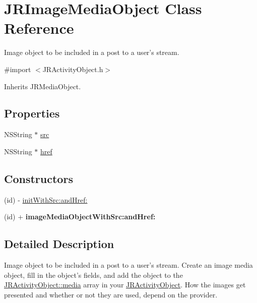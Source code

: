 \hypertarget{interface_j_r_image_media_object}{
\section{JRImageMediaObject Class Reference}
\label{interface_j_r_image_media_object}
}


Image object to be included in a post to a user's stream.  




{\ttfamily \#import $<$JRActivityObject.h$>$}



Inherits JRMediaObject.

\subsection*{Properties}
\begin{DoxyCompactItemize}
\item 
NSString $\ast$ \hyperlink{interface_j_r_image_media_object_aad75823f9189dfca758bc4d4712c3621}{src}
\item 
NSString $\ast$ \hyperlink{interface_j_r_image_media_object_a95642c3f4bc97a112a3ab32beef46f66}{href}
\end{DoxyCompactItemize}
\subsection*{Constructors}
\label{_amgrp559a25fdb98a7d1fd1c3771ac568d5e9}
 \begin{DoxyCompactItemize}
\item 
(id) -\/ \hyperlink{interface_j_r_image_media_object_a8a15f579b784dbdcdaeea9dc1da56cb3}{initWithSrc:andHref:}
\item 
\hypertarget{interface_j_r_image_media_object_af1e6318b91ab6cda8eba464767b2c81d}{
(id) + {\bfseries imageMediaObjectWithSrc:andHref:}}
\label{interface_j_r_image_media_object_af1e6318b91ab6cda8eba464767b2c81d}

\end{DoxyCompactItemize}


\subsection{Detailed Description}
Image object to be included in a post to a user's stream. Create an image media object, fill in the object's fields, and add the object to the \hyperlink{interface_j_r_activity_object_a2e4ff78f83d0f353f8e0c17ed48ce0ab}{JRActivityObject::media} array in your \hyperlink{interface_j_r_activity_object}{JRActivityObject}. How the images get presented and whether or not they are used, depend on the provider.

